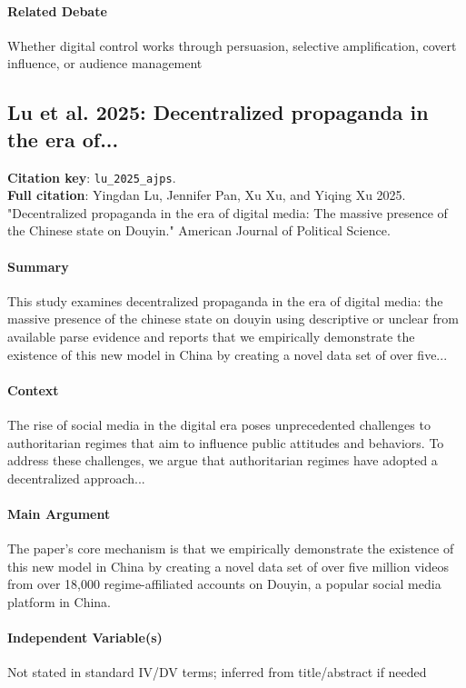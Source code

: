 \documentclass[12pt]{article}
\begin{document}
\paragraph{Related Debate} Whether digital control works through persuasion, selective amplification, covert influence, or audience management


\subsection{Lu et al. 2025: Decentralized propaganda in the era of...}
\textbf{Citation key}: \texttt{lu\_2025\_ajps}.\\
\textbf{Full citation}: Yingdan Lu, Jennifer Pan, Xu Xu, and Yiqing Xu 2025. "Decentralized propaganda in the era of digital media: The massive presence of the Chinese state on Douyin." American Journal of Political Science.

\paragraph{Summary} This study examines decentralized propaganda in the era of digital media: the massive presence of the chinese state on douyin using descriptive or unclear from available parse evidence and reports that we empirically demonstrate the existence of this new model in China by creating a novel data set of over five...

\paragraph{Context} The rise of social media in the digital era poses unprecedented challenges to authoritarian regimes that aim to influence public attitudes and behaviors. To address these challenges, we argue that authoritarian regimes have adopted a decentralized approach...

\paragraph{Main Argument} The paper's core mechanism is that we empirically demonstrate the existence of this new model in China by creating a novel data set of over five million videos from over 18,000 regime-affiliated accounts on Douyin, a popular social media platform in China.

\paragraph{Independent Variable(s)} Not stated in standard IV/DV terms; inferred from title/abstract if needed
\end{document}
